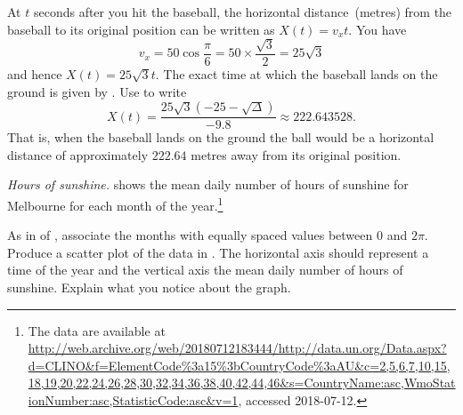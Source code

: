 \documentclass[a4paper,oneside,12pt]{article}
\begin{document}
\begin{problem}
{\begin{solution}
At $t$ seconds after you hit the baseball, the horizontal
distance~(metres) from the baseball to its original position can be
written as $X(t) = v_x t$.  You have
\[
v_x
=
50 \cos\frac{\pi}{6}
=
50 \times \frac{\sqrt{3}}{2}
=
25\sqrt{3}
\]
and hence $X(t) = 25\sqrt{3} t$.  The exact time at which the baseball
lands on the ground is given by
.  Use
 to write
\[
X(t)
=
\frac{
  25\sqrt{3} (-25 - \sqrt{\Delta})
}{
  -9.8
}
\approx
222.643528.
\]
That is, when the baseball lands on the ground the ball would be a
horizontal distance of approximately $222.64$ metres away from its
original position.
\end{solution}
}{}

\begin{table}[!htbp]
\centering

\caption{%
  The mean daily number of hours of sunshine for the city of
  Melbourne, Victoria, Australia.  The mean for each month was
  calculated using data for the years from $1961$ to $1990$.  The mean
  values are provided by the United Nations.
}
\label{tab:trigonometric:mean_daily_sunshine}
\end{table}

\item\emph{Hours of sunshine.}
   shows the mean
  daily number of hours of sunshine for Melbourne for each month of
  the year.\footnote{
    The data are available at
    \url{http://web.archive.org/web/20180712183444/http://data.un.org/Data.aspx?d=CLINO\&f=ElementCode\%3a15\%3bCountryCode\%3aAU\&c=2,5,6,7,10,15,18,19,20,22,24,26,28,30,32,34,36,38,40,42,44,46\&s=CountryName:asc,WmoStationNumber:asc,StatisticCode:asc\&v=1},
    accessed 2018-07-12.
  }
  \begin{packedenum}
  \item\label{subprob:trigonometric:mean_daily_sunshine_graph}
    As in  of
    , associate the
    months with equally spaced values between $0$ and $2\pi$.  Produce
    a scatter plot of the data in
    .  The horizontal
    axis should represent a time of the year and the vertical axis the
    mean daily number of hours of sunshine.  Explain what you notice
    about the graph.


\end{packedenum}
\end{problem}
\end{document}
